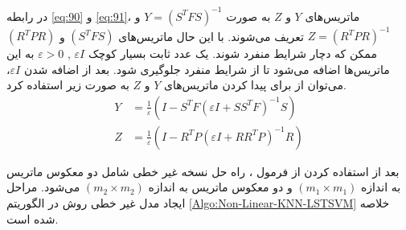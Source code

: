 در رابطه \ref{eq:90} و \ref{eq:91}، ماتریس‌های $Y$ و $Z$  به صورت  $Y={{({{S}^{T}}FS)}^{-1}}$ و  $Z={{({{R}^{T}}PR)}^{-1}}$ تعریف می‌شوند. با این حال ماتریس‌های $({{S}^{T}}FS)$ و $({{R}^{T}}PR)$  ممکن که دچار شرایط منفرد شوند. یک عدد ثابت بسیار کوچک  $\varepsilon I$ , $\varepsilon > 0$ به این ماتریس‌ها اضافه می‌شود تا از شرایط منفرد جلوگیری شود. بعد از اضافه شدن $\varepsilon I$، می‌توان از  برای پیدا کردن ماتریس‌های $Y$ و $Z$ به صورت زیر استفاده کرد.
\begin{align}
Y&= \frac{1}{\varepsilon }(I-{{S}^{T}}F{{(\varepsilon I+S{{S}^{T}}F)}^{-1}}S) \label{eq:92} \\
Z&= \frac{1}{\varepsilon }(I-{{R}^{T}}P{{(\varepsilon I+R{{R}^{T}}P)}^{-1}}R) \label{eq:93}
\end{align}

بعد از استفاده کردن از فرمول ، راه حل نسخه غیر خطی شامل دو معکوس ماتریس به اندازه  $(m_1 \times m_1)$ و دو معکوس ماتریس به اندازه $(m_2 \times m_2)$  می‌شود. مراحل ایجاد مدل غیر خطی روش  در الگوریتم \ref{Algo:Non-Linear-KNN-LSTSVM} خلاصه شده است.

